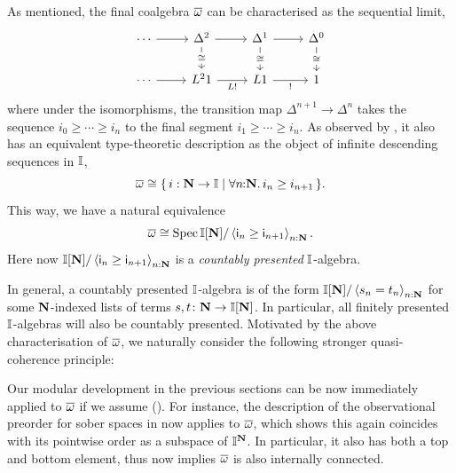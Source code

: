 \begin{example}\label{exm:ovomegasober}
  As mentioned, the final coalgebra $\overline{\omega}$ can be characterised as the sequential limit,
  \[\begin{tikzcd}
    \cdots & {\Delta^2} & {\Delta^1} & {\Delta^0} \\
    \cdots & {L^21} & L1 & 1
    \arrow[from=1-1, to=1-2]
    \arrow[from=1-2, to=1-3]
    \arrow["\cong"{description}, from=1-2, to=2-2]
    \arrow[from=1-3, to=1-4]
    \arrow["\cong"{description}, from=1-3, to=2-3]
    \arrow["\cong"{description}, from=1-4, to=2-4]
    \arrow[from=2-1, to=2-2]
    \arrow["{L!}"', from=2-2, to=2-3]
    \arrow["{!}"', from=2-3, to=2-4]
  \end{tikzcd}\]
  where under the isomorphisms, the transition map $\Delta^{n+1} \to \Delta^n$ takes the sequence $i_0 \ge \cdots \ge i_n$ to the final segment $i_1 \ge \cdots \ge i_n$. As observed by \citet[Sec.\ 5.2]{hyland1990first}, it also has an equivalent type-theoretic description as the object of infinite descending sequences in $\mathbb{I}$,
  \[ \ov\omega \cong \scomp{i : \N \to \I}{\fa n\N i_n \ge i_{n+1}}\text{.} \]
  This way, we have a natural equivalence
  \[ \ov\omega \cong \spec\I[\N]/\pair{\ms{i}_n \ge \ms{i}_{n+1}}_{n:\N}\text{.} \]
  Here now $\mathbb{I}[\mathbf{N}]/\left\langle\mathsf{i}_n \ge \mathsf{i}_{n+1}\right\rangle_{n:\mathbf{N}}$ is a \emph{countably presented} $\mathbb{I}$-algebra.
\end{example}

In general, a countably presented $\mathbb{I}$-algebra is of the form $\mathbb{I}[\mathbf{N}]/\left\langle s_n = t_n\right\rangle_{n:\mathbf{N}}$ for some $\mathbf{N}$-indexed lists of terms $s,t \colon \mathbf{N} \to \mathbb{I}[\mathbf{N}]$. In particular, all finitely presented $\mathbb{I}$-algebras will also be countably presented. Motivated by the above characterisation of $\overline{\omega}$, we naturally consider the following stronger quasi-coherence principle:


\PrintAxiomSQCC

\begin{remark}
  Our modular development in the previous sections can be now immediately applied to $\overline{\omega}$ if we assume (\AxiomSQCC). For instance, the description of the observational preorder for sober spaces in  now applies to $\overline{\omega}$, which shows this again coincides with its pointwise order as a subspace of $\mathbb{I}^{\mathbf{N}}$. In particular, it also has both a top and bottom element, thus  now implies $\overline{\omega}$ is also internally connected. 
\end{remark}


